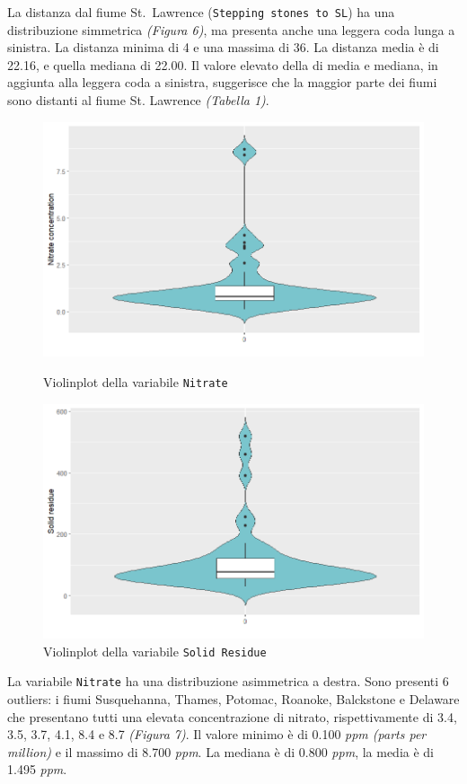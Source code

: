 \documentclass{article} %
\begin{document}
La distanza dal fiume St.\ Lawrence (\texttt{Stepping stones to SL}) ha una distribuzione simmetrica \textit{(Figura 6)}, ma presenta anche una leggera coda lunga a sinistra. La distanza minima di 4 e una massima di 36. La distanza media è di 22.16, e quella mediana di 22.00. Il valore elevato della di media e mediana, in aggiunta alla leggera coda a sinistra, suggerisce che la maggior parte dei fiumi sono distanti al fiume St. Lawrence \textit{(Tabella 1)}.


\begin{figure}[H]
    \centering
    \begin{minipage}{0.49\textwidth}
        \centering
        \includegraphics[width=\textwidth]{immagini/vp_nitrate.png}
        \captionsetup{justification=centering}
        \caption{Violinplot della variabile \texttt{Nitrate}}
    \end{minipage}
    \hfill
    \begin{minipage}{0.49\textwidth}
        \centering
        \includegraphics[width=\textwidth]{immagini/vp_sd.png}
        \captionsetup{justification=centering}
        \caption{Violinplot della variabile \texttt{Solid Residue}}
    \end{minipage}
\end{figure}
La variabile \texttt{Nitrate} ha una distribuzione asimmetrica a destra. Sono presenti 6 outliers: i fiumi Susquehanna, Thames, Potomac, Roanoke, Balckstone e Delaware che presentano tutti una elevata concentrazione di nitrato, rispettivamente di 3.4, 3.5, 3.7, 4.1, 8.4 e 8.7 \textit{(Figura 7)}. Il valore minimo è di 0.100 \textit{ppm (parts per million)} e il massimo di 8.700 \textit{ppm}. La mediana è di 0.800 \textit{ppm}, la media è di 1.495 \textit{ppm}.
\end{document}
